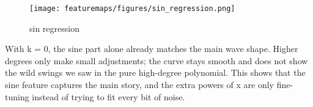 \begin{answer}
\begin{figure}[htbp]
  \centering
  \texttt{[image: featuremaps/figures/sin\_regression.png]}
  \caption{sin regression }
  \label{fig:sin regression}
\end{figure}
With k = 0, the sine part alone already matches the main wave shape.
Higher degrees only make small adjustments; the curve stays smooth and does not show the wild swings we saw in the pure high-degree polynomial. This shows that the sine feature captures the main story, and the extra powers of x are only fine-tuning instead of trying to fit every bit of noise. 
\end{answer}
